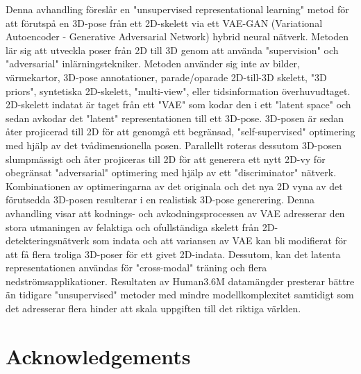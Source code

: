 Denna avhandling föreslår en "unsupervised representational learning" metod för att förutspå en 3D-pose från ett 2D-skelett via ett VAE-GAN (Variational Autoencoder - Generative Adversarial Network) hybrid neural nätverk. Metoden lär sig att utveckla poser från 2D till 3D genom att använda "supervision" och "adversarial" inlärningstekniker. Metoden använder sig inte av bilder, värmekartor, 3D-pose annotationer, parade/oparade 2D-till-3D skelett, "3D priors", syntetiska 2D-skelett, "multi-view", eller tidsinformation överhuvudtaget. 2D-skelett indatat är taget från ett "VAE" som kodar den i ett "latent space" och sedan avkodar det "latent" representationen till ett 3D-pose. 3D-posen är sedan åter projicerad till 2D för att genomgå ett begränsad, "self-supervised" optimering med hjälp av det tvådimensionella posen. Parallellt roteras dessutom 3D-posen slumpmässigt och åter projiceras till 2D för att generera ett nytt 2D-vy för obegränsat "adversarial" optimering med hjälp av ett "discriminator" nätverk. Kombinationen av optimeringarna av det originala och det nya 2D vyna av det förutsedda 3D-posen resulterar i en realistisk 3D-pose generering. Denna avhandling visar att kodnings- och avkodningsprocessen av VAE adresserar den stora utmaningen av felaktiga och ofullständiga skelett från 2D-detekteringsnätverk som indata och att variansen av VAE kan bli modifierat för att få flera troliga 3D-poser för ett givet 2D-indata. Dessutom, kan det latenta representationen användas för "cross-modal" träning och flera nedströmsapplikationer. Resultaten av Human3.6M datamängder presterar bättre än tidigare "unsupervised" metoder med mindre modellkomplexitet samtidigt som det adresserar flera hinder att skala uppgiften till det riktiga världen.


\newpage
\thispagestyle{plain}
\chapter*{Acknowledgements}

